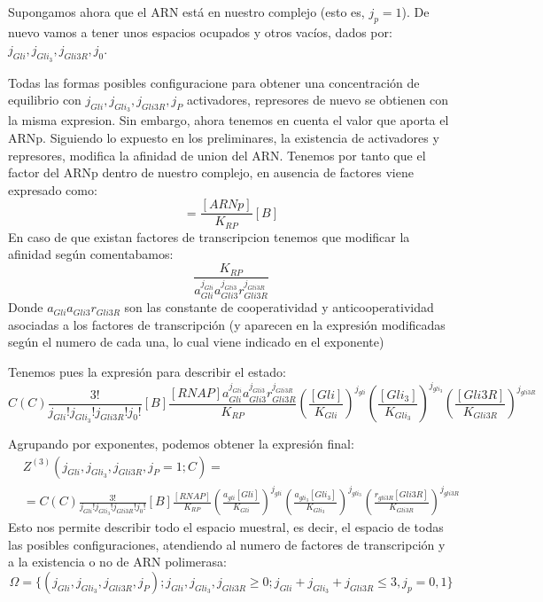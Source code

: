  Supongamos ahora que el ARN está en nuestro complejo (esto es, $j_p=1$).
 De nuevo vamos a tener unos espacios ocupados y otros vacíos, dados por: $j_{Gli}, j_{Gli_3}, j_{Gli3R}, j_0$.
 
Todas las formas posibles configuracione para obtener una concentración de equilibrio con $j_{Gli}, j_{Gli_3}, j_{Gli3R},j_P$ activadores, represores de nuevo se obtienen con la misma expresion. 
Sin embargo, ahora tenemos en cuenta el valor que aporta el ARNp. Siguiendo lo expuesto en los preliminares, la existencia de activadores y represores, modifica la afinidad de union del ARN. Tenemos por tanto que el factor del ARNp dentro de nuestro complejo, en ausencia de factores viene expresado como: 
\begin{equation}
[B.ARNp]=\frac{[ARNp]}{K_{RP}}[B]
\end{equation}
 En caso de que existan factores de transcripcion tenemos que modificar la afinidad según comentabamos:
 \begin{equation}
 \frac{K_{RP}}{a_{Gli}^{j_{Gli}}a_{Gli3}^{j_{Gli3}}r_{Gli3R}^{j_{Gli3R}}}
 \end{equation}
  Donde $a_{Gli}a_{Gli3}r_{Gli3R}$ son las constante de cooperatividad y anticooperatividad asociadas a los factores de transcripción (y aparecen en la expresión modificadas según el numero de cada una, lo cual viene indicado en el exponente)
  
  Tenemos pues la expresión para describir el estado:
\begin{equation}
\textit{C}(C)\frac{3!}{j_{Gli}! j_{Gli_3}! j_{Gli3R}!j_0!}[B]\frac{[RNAP]a_{Gli}^{j_{Gli}}a_{Gli3}^{j_{Gli3}}r_{Gli3R}^{j_{Gli3R}}}{K_{RP}}
\left(\frac{[Gli]}{K_{Gli}}\right)^{j_{gli}}
\left(\frac{[Gli_3]}{K_{Gli_3}}\right)^{j_{gli_3}}
\left(\frac{[Gli3R]}{K_{Gli3R}}\right)^{j_{gli3R}}
\end{equation}

 Agrupando por exponentes, podemos obtener la expresión final:
\begin{equation}
\begin{split}
&Z^{(3)}(j_{Gli}, j_{Gli_3}, j_{Gli3R},j_P=1;C)=\\&=\textit{C}(C)\frac{3!}{j_{Gli}! j_{Gli_3}! j_{Gli3R}!j_0!}[B]\frac{[RNAP]}{K_{RP}}
\left(\frac{a_{gli}[Gli]}{K_{Gli}}\right)^{j_{gli}}
\left(\frac{a_{gli_3}[Gli_3]}{K_{Gli_3}}\right)^{j_{gli_3}}
\left(\frac{r_{gli3R}[Gli3R]}{K_{Gli3R}}\right)^{j_{gli3R}}
\end{split}
\end{equation}
Esto nos permite describir todo el espacio muestral, es decir, el espacio de todas las posibles configuraciones, atendiendo al numero de factores de transcripción y a la existencia o no de ARN polimerasa:
\begin{equation}
\Omega=\{(j_{Gli}, j_{Gli_3}, j_{Gli3R},j_P);j_{Gli}, j_{Gli_3}, j_{Gli3R}\geq0;j_{Gli}+ j_{Gli_3}+ j_{Gli3R}\leq 3,j_p=0,1\}
\end{equation}


